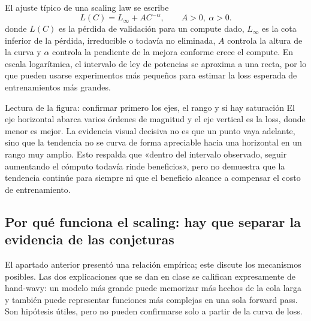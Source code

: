 
El ajuste típico de una scaling law se escribe
\[
L(C)=L_{\infty}+A C^{-\alpha},\qquad A>0,\ \alpha>0.
\]
donde $L(C)$ es la pérdida de validación para un compute dado, $L_{\infty}$ es la cota inferior de la pérdida, irreducible o todavía no eliminada, $A$ controla la altura de la curva y $\alpha$ controla la pendiente de la mejora conforme crece el compute. En escala logarítmica, el intervalo de ley de potencias se aproxima a una recta, por lo que pueden usarse experimentos más pequeños para estimar la loss esperada de entrenamientos más grandes.

\begin{knowledgebox}{Lectura de la figura: confirmar primero los ejes, el rango y si hay saturación}
El eje horizontal abarca varios órdenes de magnitud y el eje vertical es la loss, donde menor es mejor. La evidencia visual decisiva no es que un punto vaya adelante, sino que la tendencia no se curva de forma apreciable hacia una horizontal en un rango muy amplio. Esto respalda que «dentro del intervalo observado, seguir aumentando el cómputo todavía rinde beneficios», pero no demuestra que la tendencia continúe para siempre ni que el beneficio alcance a compensar el costo de entrenamiento.
\end{knowledgebox}


\subsection{Por qué funciona el scaling: hay que separar la evidencia de las conjeturas}

El apartado anterior presentó una relación empírica; este discute los mecanismos posibles. Las dos explicaciones que se dan en clase se califican expresamente de hand-wavy: un modelo más grande puede memorizar más hechos de la cola larga y también puede representar funciones más complejas en una sola forward pass. Son hipótesis útiles, pero no pueden confirmarse solo a partir de la curva de loss.

